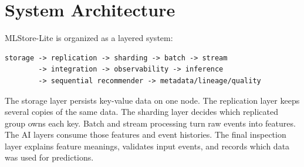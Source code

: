 \section{System Architecture}\label{sec:architecture}

MLStore-Lite is organized as a layered system:

\begin{lstlisting}
storage -> replication -> sharding -> batch -> stream
        -> integration -> observability -> inference
        -> sequential recommender -> metadata/lineage/quality
\end{lstlisting}

The storage layer persists key-value data on one node. The replication layer
keeps several copies of the same data. The sharding layer decides which
replicated group owns each key. Batch and stream processing turn raw events into
features. The AI layers consume those features and event histories. The final
inspection layer explains feature meanings, validates input events, and records
which data was used for predictions.

